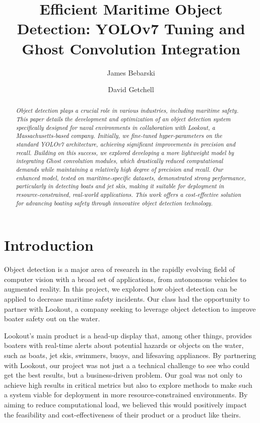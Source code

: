 \documentclass[sigplan,nonacm]{acmart}
\title{Efficient Maritime Object Detection: YOLOv7 Tuning and Ghost Convolution Integration}
\author{James Bebarski}
\affiliation{%
    \institution{Roux Institute at Northeastern University}
    \city{Portland}
    \state{Maine}
    \country{USA}
}
\author{David Getchell}
\affiliation{%
    \institution{Roux Institute at Northeastern University}
    \city{Portland}
    \state{Maine}
    \country{USA}
\email{getchell.da@northeastern.edu}
}
\begin{document}
\begin{abstract}
\textit{Object detection plays a crucial role in various industries, including maritime safety. This paper details the development and optimization of an object detection system specifically designed for naval environments in collaboration with Lookout, a Massachusetts-based company. Initially, we fine-tuned hyper-parameters on the standard YOLOv7 architecture, achieving significant improvements in precision and recall. Building on this success, we explored developing a more lightweight model by integrating Ghost convolution modules, which drastically reduced computational demands while maintaining a relatively high degree of precision and recall. Our enhanced model, tested on maritime-specific datasets, demonstrated strong performance, particularly in detecting boats and jet skis, making it suitable for deployment in resource-constrained, real-world applications. This work offers a cost-effective solution for advancing boating safety through innovative object detection technology.}
\end{abstract}




\maketitle

\section*{Introduction}
Object detection is a major area of research in the rapidly evolving field of computer vision with a broad set of applications, from autonomous vehicles to augmented reality. In this project, we explored how object detection can be applied to decrease maritime safety incidents. Our class had the opportunity to partner with Lookout, a company seeking to leverage object detection to improve boater safety out on the water.  

Lookout's main product is a head-up display that, among other things, provides boaters with real-time alerts about potential hazards or objects on the water, such as boats, jet skis, swimmers, buoys, and lifesaving appliances. By partnering with Lookout, our project was not just a a technical challenge to see who could get the best results, but a business-driven problem. Our goal was not only to achieve high results in critical metrics but also to explore methods to make such a system viable for deployment in more resource-constrained environments. By aiming to reduce computational load, we believed this would positively impact the feasibility and cost-effectiveness of their product or a product like theirs. 
\end{document}
